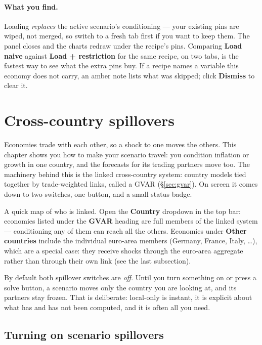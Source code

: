 \documentclass[11pt]{article}
\theoremstyle{definition}
\theoremstyle{remark}
\begin{document}
\paragraph{What you find.} Loading \emph{replaces} the active scenario's
conditioning --- your existing pins are wiped, not merged, so switch to a fresh tab
first if you want to keep them. The panel closes and the charts redraw under the
recipe's pins. Comparing \textbf{Load naive} against \textbf{Load + restriction} for
the same recipe, on two tabs, is the fastest way to see what the extra pins buy. If
a recipe names a variable this economy does not carry, an amber note lists what was
skipped; click \textbf{Dismiss} to clear it.

\section{Cross-country spillovers}\label{sec:use-spillovers}

Economies trade with each other, so a shock to one moves the others. This chapter
shows you how to make your scenario travel: you condition inflation or growth in
one country, and the forecasts for its trading partners move too. The machinery
behind this is the linked cross-country system: country models tied together by
trade-weighted links, called a GVAR (\S\ref{sec:gvar}). On screen it comes down
to two switches, one button, and a small status badge.

A quick map of who is linked. Open the \textbf{Country} dropdown in the top bar:
economies listed under the \textbf{GVAR} heading are full members of the linked
system --- conditioning any of them can reach all the others. Economies under
\textbf{Other countries} include the individual euro-area members (Germany,
France, Italy, \dots), which are a special case: they receive shocks through the
euro-area aggregate rather than through their own link (see the last subsection).

By default both spillover switches are \emph{off}. Until you turn something on or
press a solve button, a scenario moves only the country you are looking at, and
its partners stay frozen. That is deliberate: local-only is instant, it is
explicit about what has and has not been computed, and it is often all you need.

\subsection{Turning on scenario spillovers}
\end{document}
